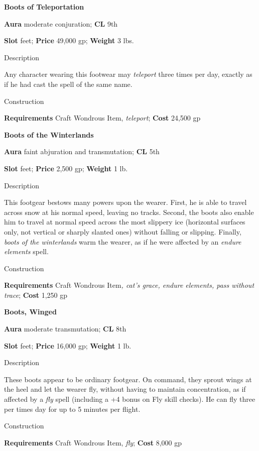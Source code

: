 \textbf{Boots of Teleportation}
				
\textbf{Aura} moderate conjuration;\textbf{ CL }9th
				
\textbf{Slot} feet; \textbf{Price} 49,000 gp; \textbf{Weight} 3 lbs.
				
Description
				
Any character wearing this footwear may \textit{teleport }three times per day, exactly as if he had cast the spell of the same name. 
				
Construction
				
\textbf{Requirements} Craft Wondrous Item, \textit{teleport}; \textbf{Cost }24,500 gp
				
\textbf{Boots of the Winterlands}
				
\textbf{Aura} faint abjuration and transmutation;\textbf{ CL }5th
				
\textbf{Slot} feet; \textbf{Price} 2,500 gp; \textbf{Weight} 1 lb.
				
Description
				
This footgear bestows many powers upon the wearer. First, he is able to travel across snow at his normal speed, leaving no tracks. Second, the boots also enable him to travel at normal speed across the most slippery ice (horizontal surfaces only, not vertical or sharply slanted ones) without falling or slipping. Finally, \textit{boots of the winterlands }warm the wearer, as if he were affected by an \textit{endure elements }spell. 
				
Construction
				
\textbf{Requirements} Craft Wondrous Item\textit{, cat's grace, endure elements, pass without trace}; \textbf{Cost }1,250 gp
				
\textbf{Boots, Winged}
				
\textbf{Aura} moderate transmutation;\textbf{ CL }8th
				
\textbf{Slot} feet; \textbf{Price} 16,000 gp; \textbf{Weight} 1 lb.
				
Description
				
These boots appear to be ordinary footgear. On command, they sprout wings at the heel and let the wearer fly, without having to maintain concentration, as if affected by a \textit{fly }spell (including a +4 bonus on Fly skill checks). He can fly three per times day for up to 5 minutes per flight.
				
Construction
				
\textbf{Requirements} Craft Wondrous Item, \textit{fly}; \textbf{Cost }8,000 gp
				
